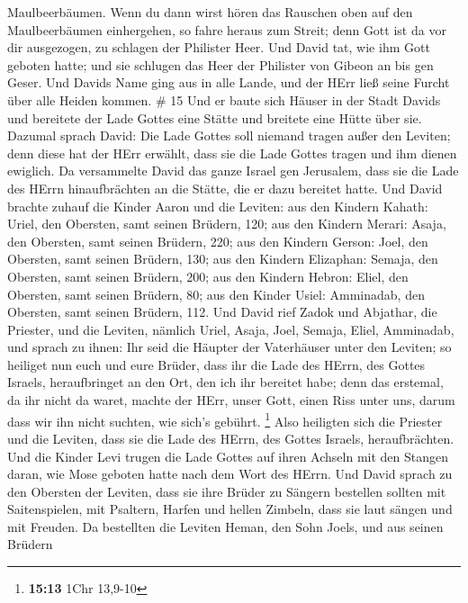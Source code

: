 Maulbeerbäumen.  Wenn du dann wirst hören das Rauschen oben
auf den Maulbeerbäumen einhergehen, so fahre heraus zum Streit; denn
Gott ist da vor dir ausgezogen, zu schlagen der Philister Heer.
 Und David tat, wie ihm Gott geboten hatte; und sie
schlugen das Heer der Philister von Gibeon an bis gen Geser.
 Und Davids Name ging aus in alle Lande, und der HErr ließ
seine Furcht über alle Heiden kommen. \# 15  Und er baute
sich Häuser in der Stadt Davids und bereitete der Lade Gottes eine
Stätte und breitete eine Hütte über sie.  Dazumal sprach
David: Die Lade Gottes soll niemand tragen außer den Leviten; denn diese
hat der HErr erwählt, dass sie die Lade Gottes tragen und ihm dienen
ewiglich.  Da versammelte David das ganze Israel gen
Jerusalem, dass sie die Lade des HErrn hinaufbrächten an die Stätte, die
er dazu bereitet hatte.  Und David brachte zuhauf die Kinder
Aaron und die Leviten:  aus den Kindern Kahath: Uriel, den
Obersten, samt seinen Brüdern, 120;  aus den Kindern Merari:
Asaja, den Obersten, samt seinen Brüdern, 220;  aus den
Kindern Gerson: Joel, den Obersten, samt seinen Brüdern, 130;
 aus den Kindern Elizaphan: Semaja, den Obersten, samt
seinen Brüdern, 200;  aus den Kindern Hebron: Eliel, den
Obersten, samt seinen Brüdern, 80;  aus den Kinder Usiel:
Amminadab, den Obersten, samt seinen Brüdern, 112.  Und
David rief Zadok und Abjathar, die Priester, und die Leviten, nämlich
Uriel, Asaja, Joel, Semaja, Eliel, Amminadab,  und sprach
zu ihnen: Ihr seid die Häupter der Vaterhäuser unter den Leviten; so
heiliget nun euch und eure Brüder, dass ihr die Lade des HErrn, des
Gottes Israels, heraufbringet an den Ort, den ich ihr bereitet habe;
 denn das erstemal, da ihr nicht da waret, machte der HErr,
unser Gott, einen Riss unter uns, darum dass wir ihn nicht suchten, wie
sich's gebührt. \footnote{\textbf{15:13} 1Chr 13,9-10} 
Also heiligten sich die Priester und die Leviten, dass sie die Lade des
HErrn, des Gottes Israels, heraufbrächten.  Und die Kinder
Levi trugen die Lade Gottes auf ihren Achseln mit den Stangen daran, wie
Mose geboten hatte nach dem Wort des HErrn.  Und David
sprach zu den Obersten der Leviten, dass sie ihre Brüder zu Sängern
bestellen sollten mit Saitenspielen, mit Psaltern, Harfen und hellen
Zimbeln, dass sie laut sängen und mit Freuden.  Da
bestellten die Leviten Heman, den Sohn Joels, und aus seinen Brüdern
